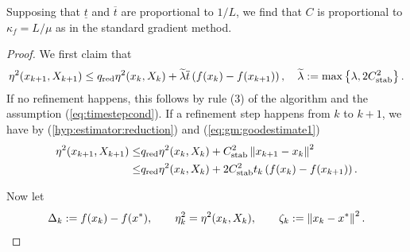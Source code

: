%
\begin{remark}\label{rmk:}
Supposing that $\underline{t}$ and $\overline{t}$ are proportional to $1/L$, we find that $C$ is proportional to $\kappa_f = L/\mu$ as in the standard gradient method.
\end{remark}
%
\begin{proof}
We first claim that
%
\begin{equation}\label{eq:gm:help2}
\eta^2(x_{k+1},X_{k+1}) \le q_{\rm red} \eta^2(x_{k}, X_k) + \widetilde{\lambda} \overline{t} \left(f(x_{k})-f(x_{k+1})\right),\quad\widetilde{\lambda} := \max\left\{\lambda,2C_{\rm stab}^2\right\}. 
\end{equation}
%
If no refinement happens, this follows by rule (3) of the algorithm and the assumption (\ref{eq:timestepcond}).
If a refinement step happens from $k$ to $k+1$, we have by (\ref{hyp:estimator:reduction}) and (\ref{eq:gm:goodestimate1})
%
\begin{align*}
\eta^2(x_{k+1},X_{k+1}) \le& q_{\rm red} \eta^2(x_{k}, X_k) + C_{\rm stab}^2\left\|x_{k+1}-x_{k}\right\|^2\\
\le& q_{\rm red} \eta^2(x_{k}, X_k) + 2C_{\rm stab}^2 t_k \left(f(x_{k})-f(x_{k+1})\right).
\end{align*}
%

Now let
%
\begin{align*}
\Delta_{k} := f(x_{k}) -f(x^*),\qquad \eta^2_k = \eta^2(x_{k}, X_k),\qquad \zeta_k:= \left\|x_k-x^*\right\|^2.
\end{align*}
%


\end{proof}
